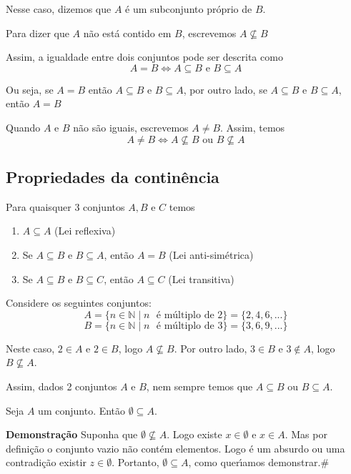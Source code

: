 Nesse caso, dizemos que $A$ {\'e} um subconjunto pr{\'o}prio de $B$.

Para dizer que $A$ n{\~a}o est{\'a} contido em $B$, escrevemos $A \nsubseteq B$

Assim, a igualdade entre dois conjuntos pode ser descrita como
\[ A = B \Leftrightarrow A \subseteq B \mbox{ e } B \subseteq A\]

Ou seja, se $A = B$ ent{\~a}o $A \subseteq B$ e $B \subseteq A$, por outro lado, se $A \subseteq B$ e $B \subseteq A$, ent{\~a}o $A = B$

Quando $A$ e $B$ n{\~a}o s{\~a}o iguais, escrevemos $A \neq B$. Assim, temos
\[ A \neq B \Leftrightarrow A \nsubseteq B \mbox{ ou } B \nsubseteq A\]

\subsection{Propriedades da contin{\^e}ncia}
Para quaisquer 3 conjuntos $A,B$ e $C$ temos
\begin{enumerate}
\item $A\subseteq A$ (Lei reflexiva)
\item Se $A\subseteq B \mbox{ e } B\subseteq A$, ent{\~a}o $A=B$ (Lei anti-sim{\'e}trica)
\item Se $A\subseteq B$ e $B\subseteq C$, ent{\~a}o $A\subseteq C$ (Lei transitiva)
\end{enumerate}

Considere os seguintes conjuntos:
\[A = \{ n \in \mathbb{N} \mid n \mbox{ {\'e} m{\'u}ltiplo de } 2\}=\{2,4,6,...\}\]
\[ B = \{n\in\mathbb{N} \mid n \mbox{ {\'e} m{\'u}ltiplo de } 3\}=\{3,6,9,...\}\]

Neste caso, $2 \in A$ e $2 \in B$, logo $A \nsubseteq B$. Por outro lado, $3 \in B$ e $3 \notin A$, logo $B \nsubseteq A$.

Assim, dados 2 conjuntos $A$ e $B$, nem sempre temos que $A \subseteq B$ ou $B \subseteq A$.

\begin{proposicao} Seja $A$ um conjunto. Ent{\~a}o $ \emptyset \subseteq A$.\end{proposicao}

\textbf{Demonstra{\c c}{\~a}o} Suponha que $ \emptyset \nsubseteq A$. Logo existe $x \in \emptyset$ e $x \in A$. Mas por defini{\c c}{\~a}o o conjunto vazio n{\~a}o cont{\'e}m elementos. Logo {\'e} um absurdo ou uma contradi{\c c}{\~a}o existir $z \in \emptyset$. Portanto, $ \emptyset \subseteq A$, como quer{\'\i}amos demonstrar.\#

